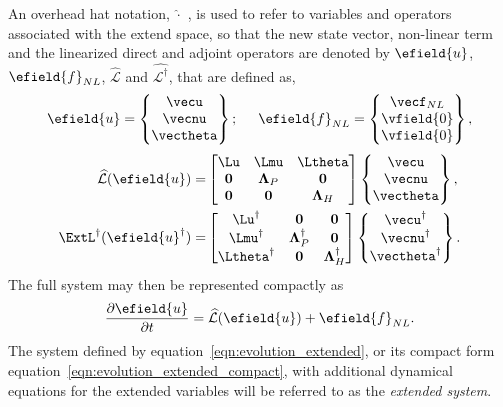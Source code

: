 An overhead hat notation, $\widehat{\cdot}$ , is used to refer to variables and operators associated with the extend space, so that the new state vector, non-linear term and the linearized direct and adjoint operators are denoted by $\efield{u}$, $\efield{f}_{NL}$, $\widehat{\mathcal{L}}$ and $\widehat{\mathcal{L}^{\dagger}}$, that are defined as,
\begin{align}
	\efield{u} = \begin{Bmatrix}
		\vecu \\ 
		\vecnu \\
		\vectheta
	\end{Bmatrix}; \hspace{5mm}
	\efield{f}_{NL} = \begin{Bmatrix}
		\vecf_{NL} \\ 
		\vfield{0}	\\
		\vfield{0}
	\end{Bmatrix},
\end{align}
%
\begin{align}
	\mathcal{\widehat{L}}(\efield{u}) =&
	\begin{bmatrix}
		\Lu & \Lmu & \Ltheta \\
		\mathbf{0} 	& \mathbf{\Lambda}_{P} & \mathbf{0} \\
		\mathbf{0} 	& \mathbf{0} &  \mathbf{\Lambda}_{H}
	\end{bmatrix}
	\begin{Bmatrix}
		\vecu \\
		\vecnu \\
		\vectheta
	\end{Bmatrix}
	\label{eqn:linearized_operator_extended}, \\
		\ExtL^{\dagger}(\efield{u}^{\dagger}) =&
	\begin{bmatrix}
		\Lu^{\dagger} 		   & \mathbf{0} & \mathbf{0} \\
		\Lmu^{\dagger}	 	& \mathbf{\Lambda}^{\dagger}_{P} & \mathbf{0} \\
		\Ltheta^{\dagger}  & \mathbf{0} & \mathbf{\Lambda}^{\dagger}_{H} \\
	\end{bmatrix}
	\begin{Bmatrix}
		\vecu^{\dagger} \\
		\vecnu^{\dagger} \\
		\vectheta^{\dagger}
	\end{Bmatrix}
	\label{eqn:adjoint_operator_extended}.
\end{align}
The full system may then be represented compactly as
\begin{equation}
	\label{eqn:evolution_extended_compact}
	\dfrac{\partial \efield{u}}{\partial t} =
	\mathcal{\widehat{L}}(\efield{u})  + \efield{f}_{NL}.
\end{equation}
The system defined by equation~\eqref{eqn:evolution_extended}, or its compact form equation~\eqref{eqn:evolution_extended_compact}, with additional dynamical equations for the extended variables will be referred to as the \emph{extended system}. 

